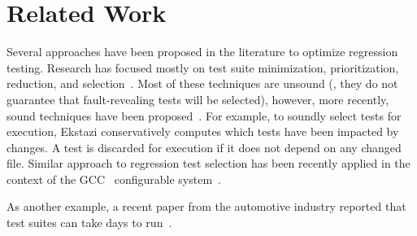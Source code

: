 \section{Related Work}
\label{sec:related}

Several approaches have been proposed in the literature to optimize
regression testing.  Research has focused mostly on test suite
minimization, prioritization, reduction, and
selection~\cite{yoo-harman-stvr2012}.  Most of these techniques are
unsound (\ie{}, they do not guarantee that fault-revealing tests will
be selected), however, more recently, sound techniques have been
proposed~\cite{gligoric-etal-issta2015,soetens-etal-2016}.  For
example, to soundly select tests for execution,
Ekstazi\cite{ekstazi-web,gligoric-etal-issta2015} conservatively
computes which tests have been impacted by changes.  A test is
discarded for execution if it does not depend on any changed file.
Similar approach to regression test selection has been recently
applied in the context of the GCC~\cite{gcc} configurable
system~\cite{souto-damorim-jss}.

As another example, a recent paper from the
automotive industry reported that test suites can take days to
run~\cite{artl-etal-icst2015}.
